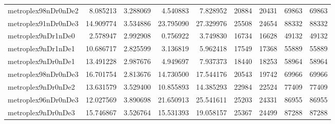 \begin{longtable}{|l|r|r|r|r|r|r|r|r|}
metroplex98nDr0nDe2 & 8.085213 & 3.288069 & 4.540883 & 7.828952 & 20884 & 20431 & 69863 & 69863 \\
metroplex91nDr0nDe3 & 14.909774 & 3.534886 & 23.795090 & 27.329976 & 25508 & 24654 & 88332 & 88332 \\
metroplex9nDr1nDe0 & 2.578947 & 2.992908 & 0.756922 & 3.749830 & 16734 & 16628 & 49132 & 49132 \\
metroplex9nDr1nDe1 & 10.686717 & 2.825599 & 3.136819 & 5.962418 & 17549 & 17368 & 55889 & 55889 \\
metroplex9nDr0nDe1 & 13.491228 & 2.987676 & 4.949697 & 7.937373 & 18440 & 18253 & 58964 & 58964 \\
metroplex98nDr0nDe3 & 16.701754 & 2.813676 & 14.730500 & 17.544176 & 20543 & 19742 & 69966 & 69966 \\
metroplex9nDr0nDe2 & 13.631579 & 3.529400 & 10.855893 & 14.385293 & 22984 & 22524 & 77409 & 77409 \\
metroplex96nDr0nDe3 & 12.027569 & 3.890698 & 21.650913 & 25.541611 & 25203 & 24331 & 86955 & 86955 \\
metroplex9nDr0nDe3 & 15.746867 & 3.526764 & 15.531393 & 19.058157 & 25367 & 24499 & 87288 & 87288 \\
\end{longtable}
